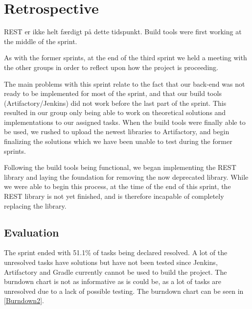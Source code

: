 \section{Retrospective}
REST er ikke helt færdigt på dette tidspunkt. Build tools were first working at
the middle of the sprint. 

As with the former sprints, at the end of the third sprint we held a meeting
with the other groups in order to reflect upon how the project is proceeding.\nl

The main problems with this sprint relate to the fact that our back-end was not
ready to be implemented for most of the sprint, and that our build tools
(Artifactory/Jenkins) did not work before the last part of the sprint. This
resulted in our group only being able to work on theoretical solutions and
implementations to our assigned tasks. When the build tools were finally able to
be used, we rushed to upload the newest libraries to Artifactory, and begin
finalizing the solutions which we have been unable to test during the former
sprints.\nl

Following the build tools being functional, we began implementing the REST
library and laying the foundation for removing the now deprecated 
library. While we were able to begin this process, at the time of the end of
this sprint, the REST library is not yet finished, and is therefore incapable of
completely replacing the  library.

\subsection{Evaluation}
The sprint ended with 51.1\% of tasks being declared resolved. A lot of the
unresolved tasks have solutions but have not been tested since Jenkins,
Artifactory and Gradle currently cannot be used to build the project.
The burndown chart is not as informative as is could be, as a lot of tasks are
unresolved due to a lack of possible testing. The burndown chart can be seen in
\autoref{Burndown2}.

